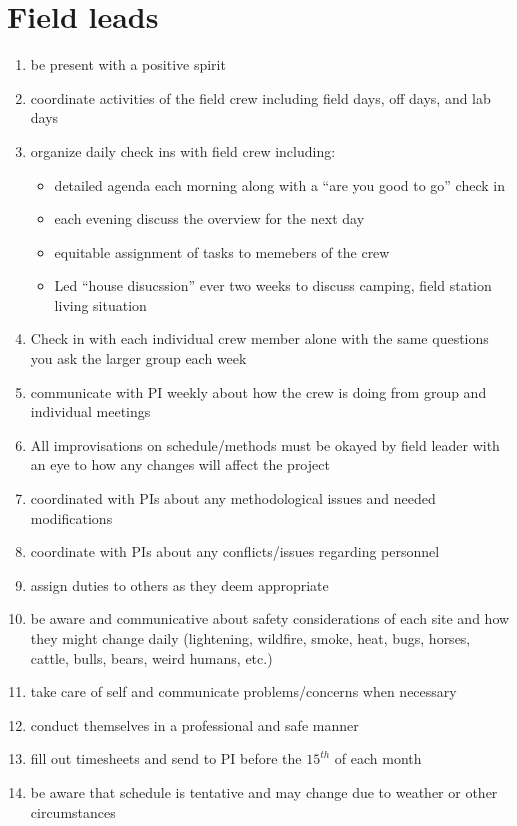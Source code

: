 \documentclass[12pt]{article}
\begin{document}
\section{Field leads}
\begin{enumerate}
\item be present with a positive spirit
\item coordinate activities of the field crew including field days,
  off days, and lab days
\item organize daily check ins with field crew including:
  \begin{itemize}
  \item detailed agenda each morning along with a ``are you good to
    go'' check in
  \item each evening discuss the overview for the next day
  \item equitable assignment of tasks to memebers of the crew
  \item Led ``house disucssion'' ever two weeks to discuss camping,
    field station living situation
  \end{itemize}
\item Check in with each individual crew member alone with the same
  questions you ask the larger group each week
\item communicate with PI weekly about how the crew is doing from group
  and individual meetings
\item All improvisations on schedule/methods must be okayed by field
  leader with an eye to how any changes will affect the project
\item coordinated with PIs about any methodological issues and needed
  modifications
\item coordinate with PIs about any conflicts/issues regarding personnel
\item assign duties to others as they deem appropriate
\item be aware and communicative about safety considerations of each
  site and how they might change daily (lightening, wildfire, smoke,
  heat, bugs, horses, cattle, bulls, bears, weird humans, etc.)
\item take care of self and communicate problems/concerns when
  necessary
\item conduct themselves in a professional and safe manner
\item fill out timesheets and send to PI before the $15^{th}$ of each month
\item be aware that schedule is tentative and may change due to weather or other circumstances 
\end{enumerate}
\end{document}

